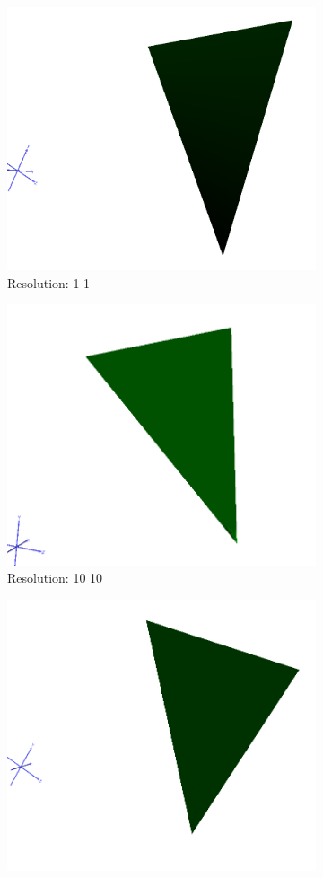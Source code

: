 \documentclass[acmlarge,nonacm=true]{acmart}
\begin{document}
\begin{figure}[H]
	\begin{subfigure}{.33\textwidth}
	  \centering
	  \includegraphics[width=.8\linewidth]{fig/1b1_1}
	  \caption{Resolution: 1 1}
	\end{subfigure}%
	\begin{subfigure}{.33\textwidth}
	  \centering
	  \includegraphics[width=.8\linewidth]{fig/1b10_10}
	  \caption{Resolution: 10 10}
	\end{subfigure}
	\begin{subfigure}{.33\textwidth}
		\centering
		\includegraphics[width=.8\linewidth]{fig/1b1000_1000}

\end{subfigure}
\end{figure}
\end{document}
